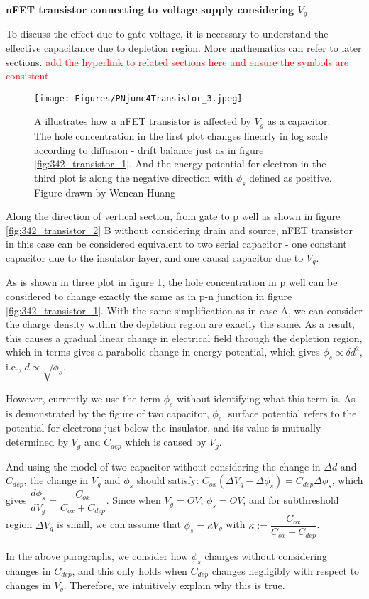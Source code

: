 \bigskip
\noindent\textbf{nFET transistor connecting to voltage supply considering \(V_{g}\)}

To discuss the effect due to gate voltage, it is necessary to understand the effective capacitance due to depletion region. More mathematics can refer to later sections. \textcolor{red}{add the hyperlink to related sections here and ensure the symbols are consistent}.

\begin{figure}[H]
    \centering
    \texttt{[image: Figures/PNjunc4Transistor\_3.jpeg]}
    \caption{A illustrates how a nFET transistor is affected by \(V_{g}\) as a capacitor. The hole concentration in the first plot changes linearly in log scale according to diffusion - drift balance just as in figure \ref{fig:342_transistor_1}. And the energy potential for electron in the third plot is along the negative direction with \(\phi_s\) defined as positive. Figure drawn by Wencan Huang}
    \label{fig:342_transistor_3}
\end{figure}

Along the direction of vertical section, from gate to p well as shown in figure \ref{fig:342_transistor_2} B without considering drain and source, nFET transistor in this case can be considered equivalent to two serial capacitor - one constant capacitor due to the insulator layer, and one causal capacitor due to \(V_{g}\). 

As is shown in three plot in figure \ref{fig:342_transistor_3}, the hole concentration in p well can be considered to change exactly the same as in p-n junction in figure \ref{fig:342_transistor_1}. With the same simplification as in case A, we can consider the charge density within the depletion region are exactly the same. As a result, this causes a gradual linear change in electrical field through the depletion region, which in terms gives a parabolic change in energy potential, which gives \(\phi_{s} \propto \delta d^2 \), i.e., \(d \propto \sqrt{\phi_{s}}\). 


However, currently we use the term \(\phi_{s}\) without identifying what this term is. As is demonstrated by the figure of two capacitor, \(\phi_s\), surface potential refers to the potential for electrons just below the insulator, and its value is mutually determined by \(V_g\) and \(C_{dep}\) which is caused by \(V_g\). 

And using the model of two capacitor without considering the change in \(\Delta d\) and \(C_{dep}\), the change in \(V_g\) and \(\phi_s\) should satisfy: \(C_{ox}(\Delta V_g - \Delta \phi_s) = C_{dep}\Delta \phi_s\), which gives \(\dfrac{d\phi_s}{dV_g} = \dfrac{C_{ox}}{C_{ox}+C_{dep}}\). Since when \(V_g = OV\), \(\phi_s = OV\), and for subthreshold region \(\Delta V_g\) is small, we can assume that \(\phi_s = \kappa V_g\) with \(\kappa := \dfrac{C_{ox}}{C_{ox}+C_{dep}}\). 

In the above paragraphs, we consider how \(\phi_s\) changes without considering changes in \(C_{dep}\), and this only holds when \(C_{dep}\) changes negligibly with respect to changes in \(V_g\). Therefore, we intuitively explain why this is true. 